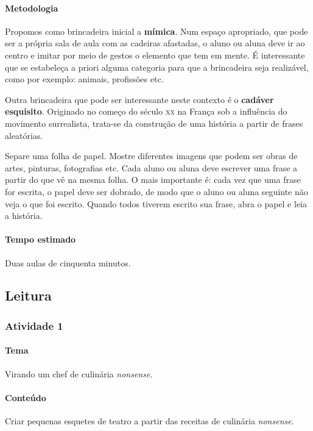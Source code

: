 \documentclass[11pt]{extarticle}
\begin{document}
\paragraph{Metodologia} Propomos como brincadeira inicial a \textbf{mímica}.
Num espaço apropriado, que pode ser a própria sala de aula com as cadeiras
afastadas, o aluno ou aluna deve ir ao centro e imitar por meio de gestos 
o elemento que tem em mente. É interessante que se estabeleça a 
priori alguma categoria  para que a brincadeira seja realizável, como
por exemplo: animais, profissões etc.

Outra brincadeira que pode ser interessante neste contexto 
é o \textbf{cadáver esquisito}. Originado no começo do século \textsc{xx} na França
sob a influência do movimento surrealista, trata-se da construção de uma história a partir
de frases aleatórias.

Separe uma folha de papel. Mostre diferentes imagens que podem ser
obras de artes, pinturas, fotografias etc. Cada aluno ou aluna
deve escrever uma frase a partir do que vê na mesma folha.
O mais importante é: cada vez que uma frase for escrita, o papel deve ser
dobrado, de modo que o aluno ou aluna seguinte não veja o que foi escrito.
Quando todos tiverem escrito sua frase, abra o papel e leia a história. 

\paragraph{Tempo estimado} Duas aulas de cinquenta minutos.


\subsection{Leitura}


\subsubsection{Atividade 1}

\paragraph{Tema} Virando um chef de culinária \emph{nonsense}.

\paragraph{Conteúdo} Criar pequenas esquetes de teatro a partir das receitas de culinária \emph{nonsense}.
\end{document}
